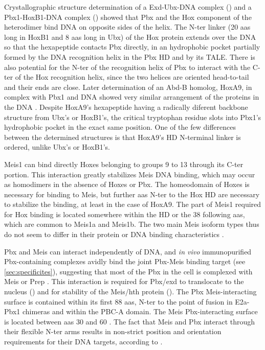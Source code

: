 Crystallographic structure determination of a Exd-Ubx-DNA complex (\cite{Passner1999}) and a Pbx1-HoxB1-DNA complex (\cite{Piper1999}) showed that Pbx and the Hox component of the heterodimer bind DNA on opposite sides of the helix. The \ac{N-ter} linker (20 \acp{aa} long in HoxB1 and 8 \acp{aa} long in Ubx) of the Hox protein extends over the DNA so that the hexapeptide contacts Pbx directly, in an hydrophobic pocket partially formed by the DNA recognition helix in the Pbx \ac{HD} and by its \ac{TALE}. There is also potential for the \ac{N-ter} of the recognition helix of Pbx to interact with the \ac{C-ter} of the Hox recognition helix, since the two helices are oriented head-to-tail and their ends are close. Later determination of an \ac{Abd-B} homolog, HoxA9, in complex with Pbx1 and DNA showed very similar arrangement of the proteins in the DNA \parencite{LaRonde-LeBlanc2003}. Despite HoxA9's hexapeptide having a radically diferent backbone structure from Ubx's or HoxB1's, the critical tryptophan residue slots into Pbx1's hydrophobic pocket in the exact same position. One of the few differences between the determined structures is that HoxA9's \ac{HD} N-terminal linker is ordered, unlike Ubx's or HoxB1's.


Meis1 can bind directly Hoxes belonging to groups 9 to 13 through its \ac{C-ter} portion. This interaction greatly stabilizes Meis DNA binding, which may occur as homodimers in the absence of Hoxes or Pbx. The homeodomain of Hoxes is necessary for binding to Meis, but further \acp{aa} \ac{N-ter} to the Hox \ac{HD} are necessary to stabilize the binding, at least in the case of HoxA9. The part of Meis1 required for Hox binding is located somewhere within the \ac{HD} or the 38 following \acp{aa}, which are common to Meis1a and Meis1b. The two main Meis isoform types thus do not seem to differ in their protein or DNA binding characteristics \parencite{Shen1997, Williams2005}. %

Pbx and Meis can interact independently of DNA, and \textit{in vivo} immunopurified Pbx-containing complexes avidly bind the joint Pbx-Meis binding target (see \ref{sec:specificites}), suggesting that most of the Pbx in the cell is complexed with Meis or Prep \parencite{Knoepfler1997, Chang1997}. This interaction is required for Pbx/exd to translocate to the nucleus (\cite{Rieckhof1997}) and for stability of the Meis/\ac{hth} protein (\cite{Abu-Shaar1998}). The Pbx Meis-interacting surface is contained within its first 88 \acp{aa}, \ac{N-ter} to the point of fusion in E2a-Pbx1 chimeras and within the PBC-A domain. The Meis Pbx-interacting surface is located between \acp{aa} 30 and 60 \parencite{Chang1997}. The fact that Meis and Pbx interact through their flexible \ac{N-ter} arms results in non-strict position and orientation requirements for their DNA targets, according to \textcite{Jacobs1999}.

